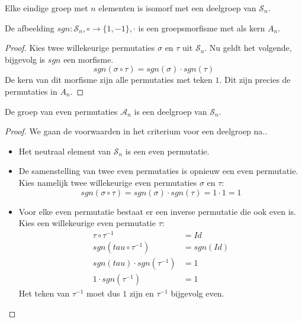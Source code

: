 \documentclass[main.tex]{subfiles}
\begin{document}
\begin{gev}
  Elke eindige groep met $n$ elementen is isomorf met een deelgroep van $\mathcal{S}_{n}$.

\end{gev}

\begin{pr}
  De afbeelding $sgn: \mathcal{S}_{n},\circ \rightarrow \{1,-1\},\cdot$ is een groepsmorfisme met als kern $A_{n}$.

  \begin{proof}
    Kies twee willekeurige permutaties $\sigma$ en $\tau$ uit $\mathcal{S}_{n}$.
    Nu geldt het volgende, bijgevolg is $sgn$ een morfisme.
    \[ sgn(\sigma \circ \tau) = sgn(\sigma) \cdot sgn(\tau) \]
    De kern van dit morfisme zijn alle permutaties met teken $1$.
    Dit zijn precies de permutaties in $A_{n}$.
  \end{proof}
\end{pr}
 
\begin{pr}
  De groep van even permutaties $\mathcal{A}_{n}$ is een deelgroep van $\mathcal{S}_{n}$.
  \begin{proof}
    We gaan de voorwaarden in het criterium voor een deelgroep na..
    \begin{itemize}
    \item Het neutraal element van $\mathcal{S}_{n}$ is een even permutatie.
    \item De samenstelling van twee even permutaties is opnieuw een even permutatie.
      Kies namelijk twee willekeurige even permutaties $\sigma$ en $\tau$:
      \[ sgn(\sigma \circ \tau) = sgn(\sigma) \cdot sgn(\tau) = 1 \cdot 1 = 1 \]
    \item Voor elke even permutatie bestaat er een inverse permutatie die ook even is.
      Kies een willekeurige even permutatie $\tau$:
      \[
      \begin{array}{rl}
        \tau \circ \tau^{-1} &= Id\\
        sgn(tau \circ \tau^{-1}) &= sgn(Id)\\
        sgn(tau) \cdot sgn(\tau^{-1}) &= 1\\
        1 \cdot sgn(\tau^{-1}) &= 1
      \end{array}
      \]
      Het teken van $\tau^{-1}$ moet dus $1$ zijn en $\tau^{-1}$ bijgevolg even.
    \end{itemize}
  \end{proof}
\end{pr}
\end{document}
